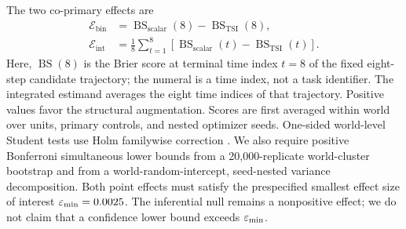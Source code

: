 The two co-primary effects are
\[
\begin{split}
\mathcal E_{\mathrm{bin}}
&=
\operatorname{BS}_{\mathrm{scalar}}(8)
-
\operatorname{BS}_{\mathrm{TSI}}(8),\\
\mathcal E_{\mathrm{int}}
&=
\frac{1}{8}\sum_{t=1}^{8}
\left[
\operatorname{BS}_{\mathrm{scalar}}(t)
-
\operatorname{BS}_{\mathrm{TSI}}(t)
\right].
\end{split}
\]
Here, \(\operatorname{BS}(8)\) is the Brier score at terminal time index
\(t=8\) of the fixed eight-step candidate trajectory; the numeral is a time
index, not a task identifier.  The integrated estimand averages the eight time
indices of that trajectory.
Positive values favor the structural augmentation.  Scores are first averaged
within world over units, primary controls, and nested optimizer seeds.
One-sided world-level Student tests use Holm familywise correction
\citep{holm1979simple}.  We also require positive Bonferroni simultaneous
lower bounds from a 20,000-replicate world-cluster bootstrap and from a
world-random-intercept, seed-nested variance decomposition.  Both point effects
must satisfy the prespecified smallest effect size of interest
\(\varepsilon_{\mathrm{min}}=0.0025\).  The inferential null remains a nonpositive effect; we do
not claim that a confidence lower bound exceeds \(\varepsilon_{\mathrm{min}}\).
